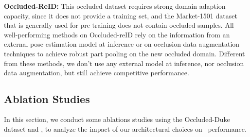 \documentclass[10pt,twocolumn,letterpaper]{article}
\begin{document}
\textbf{Occluded-ReID:}
This occluded dataset requires strong domain adaption capacity, since it does not provide a training set, and the Market-1501 dataset that is generally used for pre-training does not contain occluded samples.
All well-performing methods on Occluded-reID rely on the information from an external pose estimation model at inference \cite{PVPM, HOReID, PGFL-KD, PFD} or on occlusion data augmentation techniques \cite{FED, OPReID} to achieve robust part pooling on the new occluded domain.
Different from these methods, we don't use any external model at inference, nor occlusion data augmentation, but still achieve competitive performance. 
\subsection{Ablation Studies} \label{section:ablation_studies}
In this section, we conduct some ablations studies using the Occluded-Duke dataset and , to analyze the impact of our architectural choices on \reid\ performance.
\end{document}
